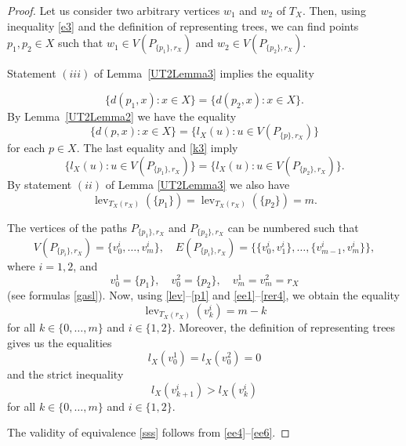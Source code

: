 \documentclass{raex}
\theoremstyle{definition}
\theoremstyle{remark}
\numberwithin{equation}{section}
\begin{document}
\begin{proof}
Let us consider two arbitrary vertices $w_1$ and $w_2$ of ${T}_{X}$. Then, using inequality \eqref{e3} and the definition of representing trees, we can find
points $p_{1},p_{2}\in X$ such that
\(
w_1\in V(P_{\{p_1\},r_X})\)
and
\(
w_2\in V(P_{\{p_2\},r_X})\).

Statement $(iii)$ of Lemma~\ref{UT2Lemma3} implies 
the equality 


\begin{equation}
    \label{k3}
\{d(p_{1},x):x\in X\}
=
\{d(p_{2},x):x\in X\}.
\end{equation}
By Lemma~\ref{UT2Lemma2} we have the equality
\[
\{d(p,x):x\in X\}
=
\{l_{X}(u):u\in  V(P_{\{p\},r_{X}})\}
\]
for each \(p\in X\).
The last equality and \eqref{k3} imply
\begin{equation*}
\{l_{X}(u):u\in V(P_{\{p_1\},r_X})\}
=
\{l_{X}(u):u\in V(P_{\{p_2\},r_X})\}.
\end{equation*}
By statement $(ii)$ of Lemma \ref{UT2Lemma3} we also have
\begin{equation}
    \label{ee1}
\operatorname{lev}_{T_X(r_X)}(\{p_1\})=\operatorname{lev}_{T_X(r_X)}(\{p_2\})=m.
\end{equation}

The vertices of the paths \(P_{\{p_1\},r_X}\) and \(P_{\{p_2\},r_X}\) can be numbered such that
\begin{equation*}
V(P_{\{p_i\},r_X})
 =\{v_0^i,\ldots,v_m^i\},
\quad
E(P_{\{p_i\},r_X})
 =\{\{v_0^i,v_1^i\},\ldots,\{v_{m-1}^i,v_m^i\}\},
\end{equation*}
where $i=1,2$, and
\begin{equation}
    \label{rer4}
v_0^1=\{p_1\},\quad
v_0^2=\{p_2\},\quad
v_m^1=v_m^2=r_X
\end{equation}
(see formulas \eqref{gasl}). 
Now, using \eqref{lev}--\eqref{p1} and \eqref{ee1}--\eqref{rer4}, we obtain the equality
\begin{equation}\label{ee4}
\operatorname{lev}_{T_X(r_X)}(v_k^i)=m-k
\end{equation}
for all $k\in\{0,\ldots,m\}$ and $ i\in \{1,2\}.$
Moreover, the definition of representing trees gives us 
the equalities
\begin{equation*}
l_X(v_0^1)=l_X(v_0^2)=0
\end{equation*}
and
the strict inequality
\begin{equation}\label{ee6}
l_X(v_{k+1}^i)>l_X(v_k^i)
\end{equation}
for all $k\in\{0,\ldots,m\}$ and $ i\in \{1,2\}.$

The validity of equivalence \eqref{sss} follows from \eqref{ee4}--\eqref{ee6}.

\end{proof}
\end{document}
